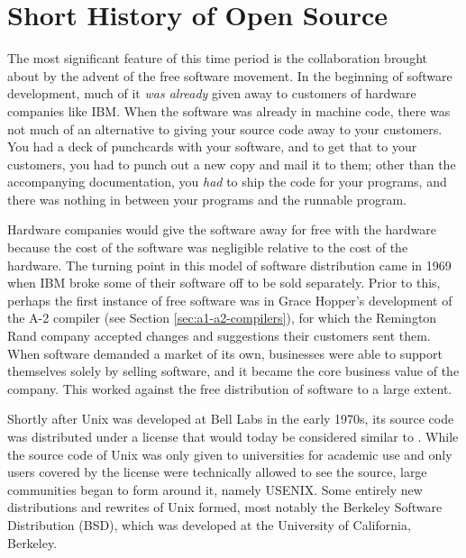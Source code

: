 
\section{Short History of Open Source}

The most significant feature of this time period is the collaboration brought about by
the advent of the free software movement.
In the beginning of software development, much of it \textit{was already} given
away to customers of hardware companies like IBM.
When the software was already in machine code, there was not
much of an alternative to giving your source code away to your customers.
You had a deck of punchcards with your software, and to get that to your customers,
you had to punch out a new copy and mail it to them; other than the accompanying documentation,
you \textit{had} to ship the code for your programs, and there was nothing in between your
programs and the runnable program.

Hardware companies would give the software away for free with the hardware because
the cost of the software was negligible relative to the cost of the hardware.
The turning point in this model of software distribution came in 1969 when IBM
broke some of their software off to be sold separately.
Prior to this, perhaps the first instance of free software was in Grace Hopper's development of
the A-2 compiler (see Section \ref{sec:a1-a2-compilers}), for which the Remington Rand company
accepted changes and suggestions their customers sent them.
When software demanded a market of its own, businesses were able to support themselves
solely by selling software, and it became the core business value of the company.
This worked against the free distribution of software to a large extent.

Shortly after Unix was developed at Bell Labs in the early 1970s, its source code
was distributed under a license that would today be considered similar to .
While the source code of Unix was only given to universities for academic use and
only users covered by the license were technically allowed to see the source,
large communities began to form around it, namely USENIX.
Some entirely new distributions and rewrites of Unix formed, most notably the
Berkeley Software Distribution (BSD), which was developed at the University of California,
Berkeley.




